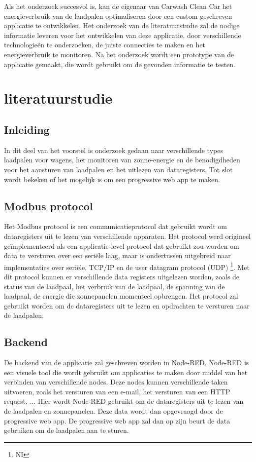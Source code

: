 Als het onderzoek succesvol is, kan de eigenaar van Carwash Clean Car het energieverbruik van de laadpalen optimaliseren door een custom geschreven applicatie te ontwikkelen. Het onderzoek van de literatuurstudie zal de nodige informatie leveren voor het ontwikkelen van deze applicatie, door verschillende technologieën te onderzoeken, de juiste connecties te maken en het energieverbruik te monitoren. Na het onderzoek wordt een prototype van de applicatie gemaakt, die wordt gebruikt om de gevonden informatie te testen.


\section{literatuurstudie}%
\label{sec:literatuurstudie}

\subsection{Inleiding}%
\label{sub:inleiding_literatuurstudie}
In dit deel van het voorstel is onderzoek gedaan naar verschillende types laadpalen voor wagens, het monitoren van zonne-energie en de benodigdheden voor het aansturen van laadpalen en het uitlezen van dataregisters. Tot slot wordt bekeken of het mogelijk is om een progressive web app te maken.

\subsection{Modbus protocol}%
\label{sub:modbus_protocol}
Het Modbus protocol is een communicatieprotocol dat gebruikt wordt om dataregisters uit te lezen van verschillende apparaten. Het protocol werd origineel geïmplementeerd als een applicatie-level protocol dat gebruikt zou worden om data te versturen over een seriële laag, maar is ondertussen uitgebreid naar implementaties over seriële, TCP/IP en de user datagram protocol (UDP) \footnote{NI}. Met dit protocol kunnen er verschillende data registers uitgelezen worden, zoals de status van de laadpaal, het verbruik van de laadpaal, de spanning van de laadpaal, de energie die zonnepanelen momenteel opbrengen. Het protocol zal gebruikt worden om de dataregisters uit te lezen en opdrachten te versturen naar de laadpalen.

\subsection{Backend}%
\label{sub:backend}
De backend van de applicatie zal geschreven worden in Node-RED. Node-RED is een visuele tool die wordt gebruikt om applicaties te maken door middel van het verbinden van verschillende nodes. Deze nodes kunnen verschillende taken uitvoeren, zoals het versturen van een e-mail, het versturen van een HTTP request, ... Hier wordt Node-RED gebruikt om de dataregisters uit te lezen van de laadpalen en zonnepanelen. Deze data wordt dan opgevraagd door de progressive web app. De progressive web app zal dan op zijn beurt de data gebruiken om de laadpalen aan te sturen.

